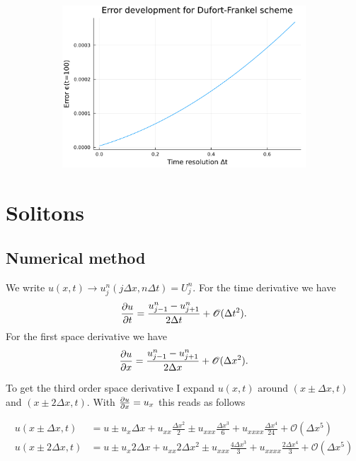 \documentclass[
	a4paper, %
	10pt, %
]{CSUniSchoolLabReport}
\begin{document}
\begin{figure}[H]
\begin{subfigure}[b]{0.49\textwidth}
	\end{subfigure}
	\hfill
	\begin{subfigure}[b]{0.49\textwidth}
		\includegraphics[width=\textwidth]{../saves_t2/error_development_df.pdf}
	\end{subfigure}
	\hfill
	\caption{}
	\label{fig:all_trunc_errors}
\end{figure}


\section{Solitons}

\subsection{Numerical method}

We write $u(x,t)\rightarrow u_{j}^n (j\Delta x, n\Delta t) = U_j^n$. For the time derivative we have 
\begin{align}
	\pdv{u}{t} = \frac{u_{j-1}^n-u_{j+1}^n}{2\Delta t} + \mathscr{O}(\Delta t^2).
\end{align}
For the first space derivative we have
\begin{align}
	\pdv{u}{x} = \frac{u_{j-1}^n-u_{j+1}^n}{2\Delta x}+ \mathscr{O}(\Delta x^2).
\end{align}

To get the third order space derivative I expand $u(x,t)$ around $(x\pm\Delta x, t)$ and $(x\pm 2\Delta x, t)$. With $\pdv{u}{x} = u_x$ this reads as follows

\begin{align*}
	u(x\pm\Delta x, t) &= u \pm u_{x} \Delta x + u_{xx} \frac{\Delta x^2}{2}\pm u_{xxx} \frac{\Delta x^3}{6} + u_{xxxx}\frac{\Delta x^4}{24} + \mathscr{O}(\Delta x^5) \\
	u(x\pm 2\Delta x, t) &= u \pm u_{x} 2\Delta x + u_{xx} 2 \Delta x^2\pm u_{xxx} \frac{4\Delta x^3}{3} + u_{xxxx}\frac{2\Delta x^4}{3} + \mathscr{O}(\Delta x^5)
\end{align*}
\end{document}
